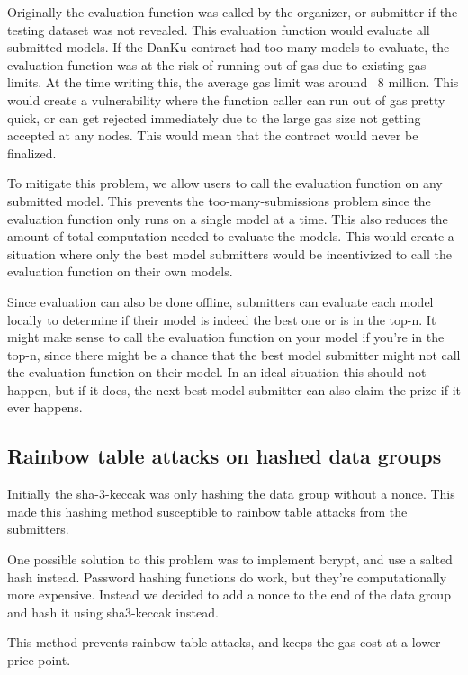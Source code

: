 \documentclass{article}
\begin{document}
Originally the evaluation function was called by the organizer, or submitter if the testing dataset was not revealed. This evaluation function would evaluate all submitted models. If the DanKu contract had too many models to evaluate, the evaluation function was at the risk of running out of gas due to existing gas limits. At the time writing this, the average gas limit was around ~8 million. This would create a vulnerability where the function caller can run out of gas pretty quick, or can get rejected immediately due to the large gas size not getting accepted at any nodes. This would mean that the contract would never be finalized.

To mitigate this problem, we allow users to call the evaluation function on any submitted model. This prevents the too-many-submissions problem since the evaluation function only runs on a single model at a time. This also reduces the amount of total computation needed to evaluate the models. This would create a situation where only the best model submitters would be incentivized to call the evaluation function on their own models.

Since evaluation can also be done offline, submitters can evaluate each model locally to determine if their model is indeed the best one or is in the top-n. It might make sense to call the evaluation function on your model if you’re in the top-n, since there might be a chance that the best model submitter might not call the evaluation function on their model. In an ideal situation this should not happen, but if it does, the next best model submitter can also claim the prize if it ever happens.

\subsection{Rainbow table attacks on hashed data groups}

Initially the sha-3-keccak was only hashing the data group without a nonce. This made this hashing method susceptible to rainbow table attacks from the submitters.

One possible solution to this problem was to implement bcrypt, and use a salted hash instead. Password hashing functions do work, but they’re computationally more expensive. Instead we decided to add a nonce to the end of the data group and hash it using sha3-keccak instead.

This method prevents rainbow table attacks, and keeps the gas cost at a lower price point.
\end{document}
